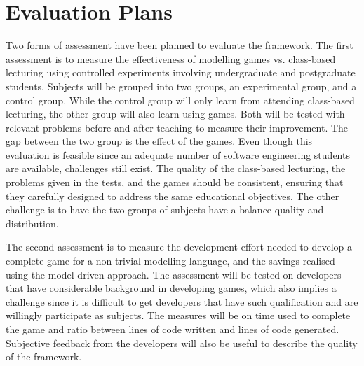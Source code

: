 \documentclass[conference]{IEEEtran}
\begin{document}
\section{Evaluation Plans}
\label{Evaluation Plans} 
Two forms of assessment have been planned to evaluate the framework. The first assessment is to measure the effectiveness of modelling games vs. class-based lecturing using controlled experiments involving undergraduate and postgraduate students. Subjects will be grouped into two groups, an experimental group, and a control group. While the control group will only learn from attending class-based lecturing, the other group will also learn using games. Both will be tested with relevant problems before and after teaching to measure their improvement. The gap between the two group is the effect of the games. Even though this evaluation is feasible since an adequate number of software engineering students are available, challenges still exist. The quality of the class-based lecturing, the problems given in the tests, and the games should be consistent, ensuring that they carefully designed to address the same educational objectives. The other challenge is to have the two groups of subjects have a balance quality and distribution. 
  
The second assessment is to measure the development effort needed to develop a complete game for a non-trivial modelling language, and the savings realised using the model-driven approach. The assessment will be tested on developers that have considerable background in developing games, which also implies a challenge since it is difficult to get developers that have such qualification and are willingly participate as subjects. The measures will be on time used to complete the game and ratio between lines of code written and lines of code generated. Subjective feedback from the developers will also be useful to describe the quality of the framework.  
  
\end{document}
